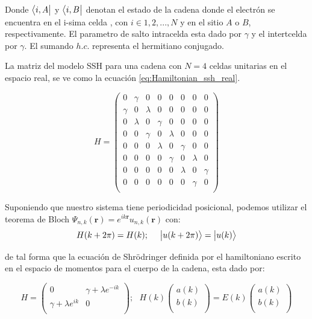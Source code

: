 Donde $\big \langle{i,A}\big |$ y $\big \langle{i,B}\big |$ denotan el estado de la cadena donde el electrón se encuentra en el i-sima celda , con $i \in {1,2,...,N}$ y en el sitio $A$ o $B$, respectivamente. El parametro de salto intracelda esta dado por $\gamma$ y el intertcelda por $\gamma$. El sumando $h.c.$ representa el hermitiano conjugado.

La matriz del modelo SSH para una cadena con $N = 4$ celdas unitarias en el espacio real, se ve como la ecuación \eqref{eq:Hamiltonian_ssh_real}.

\begin{equation}
    \label{eq:Hamiltonian_ssh_real}
    H = 
     \begin{pmatrix}
            0 & \gamma & 0 & 0 & 0 & 0 & 0 & 0 \\
            \gamma & 0 & \lambda & 0 & 0 & 0 & 0 & 0 \\
            0 & \lambda & 0 & \gamma & 0 & 0 & 0 & 0 \\
            0 & 0 & \gamma & 0 & \lambda & 0 & 0 & 0 \\
            0 & 0 & 0 & \lambda & 0 & \gamma & 0 & 0 \\
            0 & 0 & 0 & 0 & \gamma & 0 & \lambda & 0 \\
            0 & 0 & 0 & 0 & 0 & \lambda & 0 & \gamma \\
            0 & 0 & 0 & 0 & 0 & 0 & \gamma & 0 \\
            
        \end{pmatrix}
\end{equation}

Suponiendo que nuestro sistema tiene periodicidad posicional, podemos utilizar el teorema de Bloch $\Psi_{n,k}(\mathbf{r}) = e^{i k\mathbf{r}} u_{n,k}(\mathbf{r})$ con:
\begin{equation}
    H(k + 2\pi) = H(k) ; \,\,\,\,\,\,\,\, \big |{u(k + 2\pi)}\big \rangle = \big |{u(k)}\big \rangle 
\end{equation}


de tal forma que la ecuación de Shrödringer definida por el hamiltoniano escrito en el espacio de momentos para el cuerpo de la cadena, esta dado por:

\begin{equation}
    \label{eq:Hamiltonian_ssh_bloch}
    H =      
     \begin{pmatrix}
            0 & \gamma + \lambda e^{-ik}  \\
            \gamma + \lambda e^{ik} & 0  \\
        \end{pmatrix} ; \,\,\,\, H(k) \begin{pmatrix}
            a(k)   \\
            b(k)  \\
        \end{pmatrix} = E(k) \begin{pmatrix}
            a(k)   \\
            b(k)  \\
        \end{pmatrix}
\end{equation}

